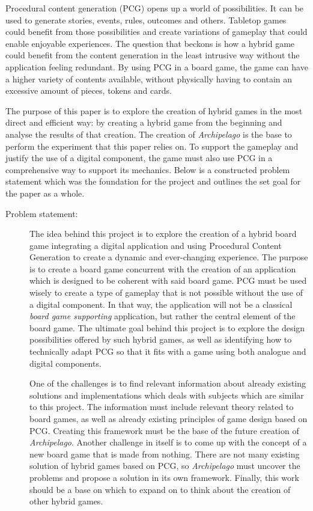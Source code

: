 Procedural content generation (PCG) opens up a world of possibilities. It can be used to generate stories, events, rules, outcomes and others. Tabletop games could benefit from those possibilities and create variations of gameplay that could enable enjoyable experiences. The question that beckons is how a hybrid game could benefit from the content generation in the least intrusive way without the application feeling redundant. By using PCG in a board game, the game can have a higher variety of contents available, without physically having to contain an excessive amount of pieces, tokens and cards. 

The purpose of this paper is to explore the creation of hybrid games in the most direct and efficient way: by creating a hybrid game from the beginning and analyse the results of that creation. The creation of \textit{Archipelago} is the base to perform the experiment that this paper relies on. To support the gameplay and justify the use of a digital component, the game must also use PCG in a comprehensive way to support its mechanics. Below is a constructed problem statement which was the foundation for the project and outlines the set goal for the paper as a whole.

\begin{description}
\item[Problem statement:]

The idea behind this project is to explore the creation of a hybrid board game integrating a digital application and using Procedural Content Generation to create a dynamic and ever-changing experience. The purpose is to create a board game concurrent with the creation of an application which is designed to be coherent with said board game. PCG must be used wisely to create a type of gameplay that is not possible without the use of a digital component. In that way, the application will not be a classical \textit{board game supporting} application, but rather the central element of the board game. The ultimate goal behind this project is to explore the design possibilities offered by such hybrid games, as well as identifying how to technically adapt PCG so that it fits with a game using both analogue and digital components.

One of the challenges is to find relevant information about already existing solutions and implementations which deals with subjects which are similar to this project. The information must include relevant theory related to board games, as well as already existing principles of game design based on PCG. Creating this framework must be the base of the future creation of \textit{Archipelago}. Another challenge in itself is to come up with the concept of a new board game that is made from nothing. There are not many existing solution of hybrid games based on PCG, so \textit{Archipelago} must uncover the problems and propose a solution in its own framework. Finally, this work should be a base on which to expand on to think about the creation of other hybrid games. 
\end{description}

